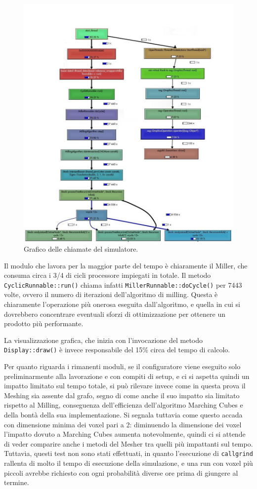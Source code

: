 \begin{figure}[htp]
	\centering
	\includegraphics[width=.97\textwidth]{./img/callgraph.jpg}
	\caption{Grafico delle chiamate del simulatore.}
	\label{fig:callgraph}
\end{figure}

Il modulo che lavora per la maggior parte del tempo è chiaramente il Miller, che consuma circa i 3/4 di cicli processore impiegati in totale. Il metodo \texttt{CyclicRunnable::run()} chiama infatti \texttt{MillerRunnable::doCycle()} per 7443 volte, ovvero il numero di iterazioni dell'algoritmo di milling. Questa è chiaramente l'operazione più onerosa eseguita dall'algoritmo, e quella in cui si dovrebbero concentrare eventuali sforzi di ottimizzazione per ottenere un prodotto più performante.

La visualizzazione grafica, che inizia con l'invocazione del metodo \texttt{Display::draw()} è invece responsabile del 15\% circa del tempo di calcolo.

Per quanto riguarda i rimanenti moduli, se il configuratore viene eseguito solo preliminarmente alla lavorazione e con compiti di setup, e ci si aspetta quindi un impatto limitato sul tempo totale, si può rilevare invece come in questa prova il Meshing sia assente dal grafo, segno di come anche il suo impatto sia limitato rispetto al Milling, conseguenza dell'efficienza dell'algoritmo Marching Cubes e della bontà della sua implementazione. Si segnala tuttavia come questo accada con dimensione minima dei voxel pari a 2: diminuendo la dimensione dei voxel l'impatto dovuto a Marching Cubes aumenta notevolmente, quindi ci si attende di veder comparire anche i metodi del Mesher tra quelli più impattanti sul tempo. Tuttavia, questi test non sono stati effettuati, in quanto l'esecuzione di \texttt{callgrind} rallenta di molto il tempo di esecuzione della simulazione, e una run con voxel più piccoli avrebbe richiesto con ogni probabilità diverse ore prima di giungere al termine.

